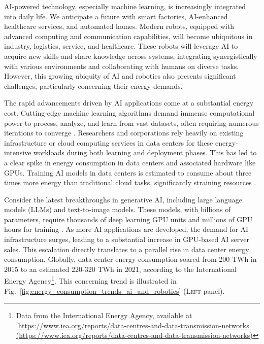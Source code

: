 \documentclass[12pt]{article}
\begin{document}

AI-powered technology, especially machine learning, is increasingly integrated into daily life. We anticipate a future with smart factories, AI-enhanced healthcare services, and automated homes. Modern robots, equipped with advanced computing and communication capabilities, will become ubiquitous in industry, logistics, service, and healthcare. These robots will leverage AI to acquire new skills and share knowledge across systems, integrating synergistically with various environments and collaborating with humans on diverse tasks. However, this growing ubiquity of AI and robotics also presents significant challenges, particularly concerning their energy demands.

The rapid advancements driven by AI applications come at a substantial energy cost. Cutting-edge machine learning algorithms demand immense computational power to process, analyze, and learn from vast datasets, often requiring numerous iterations to converge \cite{Strubell2019EnergyPolicyConsiderations}. Researchers and corporations rely heavily on existing infrastructure or cloud computing services in data centers for these energy-intensive workloads during both learning and deployment phases. This has led to a clear spike in energy consumption in data centers and associated hardware like GPUs. Training AI models in data centers is estimated to consume about three times more energy than traditional cloud tasks, significantly straining resources \cite{Thomas2023cloudusesmassive}.

Consider the latest breakthroughs in generative AI, including large language models (LLMs) and text-to-image models. These models, with billions of parameters, require thousands of deep learning GPU units and millions of GPU hours for training \cite{Vanian2023ChatGPTgenerativeAI, Corbyn2023Nvidiachipmaker}. As more AI applications are developed, the demand for AI infrastructure surges, leading to a substantial increase in GPU-based AI server sales. This escalation directly translates to a parallel rise in data center energy consumption. Globally, data center energy consumption soared from 200 TWh in 2015 to an estimated 220-320 TWh in 2021, according to the International Energy Agency\footnote{Data from the International Energy Agency, available at \url{[https://www.iea.org/reports/data-centres-and-data-transmission-networks](https://www.iea.org/reports/data-centres-and-data-transmission-networks)}}. This concerning trend is illustrated in Fig.~\ref{fig:energy_consumption_trends_ai_and_robotics} (\textsc{Left} panel).
\end{document}
